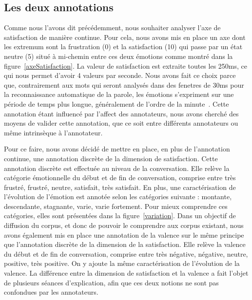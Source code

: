 \subsection{Les deux annotations}
Comme nous l'avons dit précédemment, nous souhaiter analyser l'axe de satisfaction de manière continue. Pour cela, nous avons mis en place un axe dont les extremum sont la frustration (0) et la satisfaction (10) qui passe par un état neutre (5) situé à mi-chemin entre ces deux émotions comme montré dans la figure~\ref{axeSatisfaction}. La valeur de satisfaction est extraite toutes les 250ms, ce qui nous permet d'avoir 4 valeurs par seconde. Nous avons fait ce choix parce que, contrairement aux mots qui seront analysés dans des fenetres de 30ms pour la reconnaissance automatique de la parole, les émotions s'expriment sur une période de temps plus longue, généralement de l'ordre de la minute~\cite{Schuller2010}. Cette annotation étant influencé par l'affect des annotateurs, nous avons cherché des moyens de valider cette annotation, que ce soit entre différents annotateurs ou même intrinsèque à l'annotateur.

Pour ce faire, nous avons décidé de mettre en place, en plus de l'annotation continue, une annotation discrète de la dimension de satisfaction. Cette annotation discrète est effectuée au niveau de la conversation. Elle relève la catégorie émotionnelle du début et de fin de conversation, comprise entre très frustré, frustré, neutre, satisfait, très satisfait. En plus, une caractérisation de l'évolution de l'émotion est annotée selon les catégories suivante : montante, descendante, stagnante, varie, varie fortement. Pour mieux comprendre ces catégories, elles sont présentées dans la figure~\ref{variation}.
Dans un objectif de diffusion du corpus, et donc de pouvoir le comprendre aux corpus existant, nous avons également mis en place une annotation de la valence sur le même principe que l'annotation discrète de la dimension de la satisfaction. Elle relève la valence du début et de fin de conversation, comprise entre très négative, négative, neutre, positive, très positive. On y ajoute la même caractérisation de l'évolution de la valence.
La différence entre la dimension de satisfaction et la valence a fait l'objet de plusieurs séances d'explication, afin que ces deux notions ne sont pas confondues par les annotateurs.

